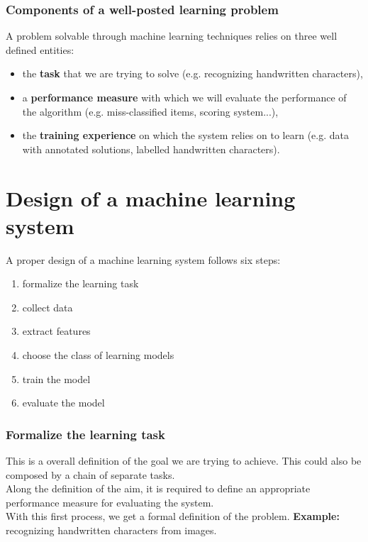 \subsubsection*{Components of a well-posted learning problem}
    A problem solvable through machine learning techniques relies on three well defined entities:
    \begin{itemize}
        \item the \textbf{task} that we are trying to solve (e.g. recognizing handwritten characters),
        \item a \textbf{performance measure} with which we will evaluate the performance of the algorithm (e.g. miss-classified items, scoring system...),
        \item the \textbf{training experience} on which the system relies on to learn (e.g. data with annotated solutions, labelled handwritten characters).
    \end{itemize}

\section{Design of a machine learning system}
    A proper design of a machine learning system follows six steps: 
    \begin{enumerate}
        \item formalize the learning task
        \item collect data
        \item extract features
        \item choose the class of learning models
        \item train the model
        \item evaluate the model
    \end{enumerate}
    
    \subsubsection*{Formalize the learning task}
        This is a overall definition of the goal we are trying to achieve. This could also be composed by a chain of separate tasks.\\ 
        Along the definition of the aim, it is required to define an appropriate performance measure for evaluating the system.\\
        With this first process, we get a formal definition of the problem. \newline
        \textbf{Example:} recognizing handwritten characters from images.
    
